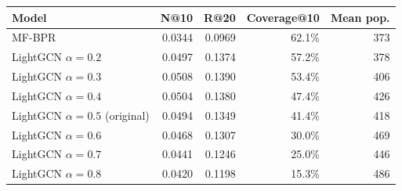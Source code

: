 \begin{tabular}{lrrrr}
\toprule
Model & N@10 & R@20 & Coverage@10 & Mean pop. \\
\midrule
MF-BPR & 0.0344 & 0.0969 & 62.1\% & 373 \\
\midrule
LightGCN $\alpha{=}0.2$ & 0.0497 & 0.1374 & 57.2\% & 378 \\
LightGCN $\alpha{=}0.3$ & 0.0508 & 0.1390 & 53.4\% & 406 \\
LightGCN $\alpha{=}0.4$ & 0.0504 & 0.1380 & 47.4\% & 426 \\
LightGCN $\alpha{=}0.5$ (original) & 0.0494 & 0.1349 & 41.4\% & 418 \\
LightGCN $\alpha{=}0.6$ & 0.0468 & 0.1307 & 30.0\% & 469 \\
LightGCN $\alpha{=}0.7$ & 0.0441 & 0.1246 & 25.0\% & 446 \\
LightGCN $\alpha{=}0.8$ & 0.0420 & 0.1198 & 15.3\% & 486 \\
\bottomrule
\end{tabular}
